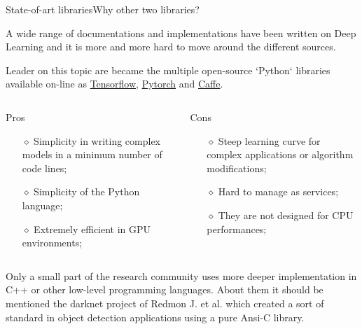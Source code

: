 \documentclass{standalone}
\begin{document}
\begin{frame}{State-of-art libraries}{Why other two libraries?}

  \scriptsize{A wide range of documentations and implementations have been written on Deep Learning and it is more and more hard to move around the different sources.}

  \scriptsize{Leader on this topic are became the multiple open-source `Python` libraries available on-line as \href{http://tensorflow.org}{Tensorflow}, \href{http://pytorch.org}{Pytorch} and \href{http://doi.acm.org/10.1145/2647868.2654889}{Caffe}.}

  \begin{columns}

    \begin{column}{0.5\textwidth}

      \begin{block}{Pros}
        \begin{itemize}
          \item[$\diamond$] Simplicity in writing complex models in a minimum number of code lines;
          \item[$\diamond$] Simplicity of the \textsf{Python} language;
          \item[$\diamond$] Extremely efficient in GPU environments;
        \end{itemize}
      \end{block}
    \end{column}
    \begin{column}{0.5\textwidth}

      \begin{alertblock}{Cons}
        \begin{itemize}
          \item[$\diamond$] Steep learning curve for complex applications or algorithm modifications;
          \item[$\diamond$] Hard to manage as services;
          \item[$\diamond$] They are not designed for CPU performances;
        \end{itemize}
      \end{alertblock}
    \end{column}

  \end{columns}

  \vspace{0.5cm}

  \scriptsize{Only a small part of the research community uses more deeper implementation in \textsf{C++} or other low-level programming languages.}
  \scriptsize{About them it should be mentioned the \textsf{darknet project} of Redmon J. et al. which created a sort of standard in object detection applications using a pure \textsf{Ansi-C} library.}

\end{frame}
\end{document}
